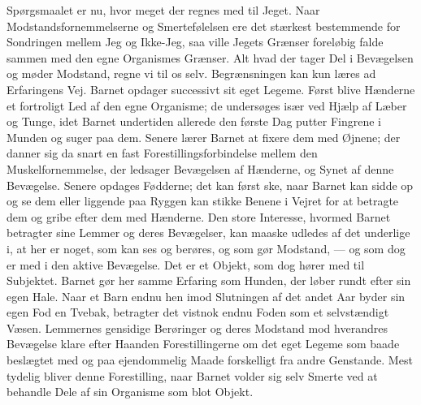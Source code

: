 \documentclass[12pt,a4paper,openany]{book}
\newcommand{\opage}[1]{\marginnote{\footnotesize\textit{[#1]}}}
\begin{document}
Spørgsmaalet er nu, hvor meget der regnes med til Jeget. Naar
Modstandsfornemmelserne og Smertefølelsen ere det stærkest bestemmende
for Sondringen mellem Jeg og Ikke-Jeg, saa ville
\opage{6}Jegets Grænser foreløbig falde sammen med den egne Organismes
Grænser. Alt hvad der tager Del i Bevægelsen og møder Modstand, regne vi
til os selv. Begrænsningen kan kun læres ad Erfaringens Vej. Barnet
opdager successivt sit eget Legeme. Først blive Hænderne et fortroligt
Led af den egne Organisme; de undersøges især ved Hjælp af Læber og
Tunge, idet Barnet undertiden allerede den første Dag putter Fingrene i
Munden og suger paa dem. Senere lærer Barnet at fixere dem med Øjnene;
der danner sig da snart en fast Forestillingsforbindelse mellem den
Muskelfornemmelse, der ledsager Bevægelsen af Hænderne, og Synet af
denne Bevægelse. Senere opdages Fødderne; det kan først ske, naar Barnet
kan sidde op og se dem eller liggende paa Ryggen kan stikke Benene i
Vejret for at betragte dem og gribe efter dem med Hænderne. Den store
Interesse, hvormed Barnet betragter sine Lemmer og deres Bevægelser, kan
maaske udledes af det underlige i, at her er noget, som kan ses og
berøres, og som gør Modstand, --- og som dog er med i den aktive
Bevægelse. Det er et Objekt, som dog hører med til Subjektet. Barnet gør
her samme Erfaring som Hunden, der løber rundt efter sin egen Hale. Naar
et Barn endnu hen imod Slutningen af det andet Aar byder sin egen Fod en
Tvebak, betragter det vistnok endnu Foden som et selvstændigt Væsen.
Lemmernes gensidige Berøringer og deres Modstand mod hverandres
Bevægelse klare efter Haanden Forestillingerne om det eget Legeme som
baade beslægtet med og paa ejendommelig Maade forskelligt fra andre
Genstande. Mest tydelig bliver denne Forestilling, naar Barnet volder
sig selv Smerte ved at behandle Dele af sin Organisme som blot Objekt.
\end{document}
